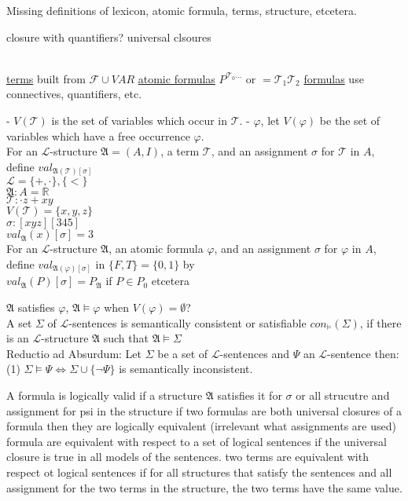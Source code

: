 \documentclass[11pt]{amsart}
\begin{document}
    Missing definitions of lexicon, atomic formula, terms, structure, etcetera.

    closure with quantifiers? universal clsoures
    \\ \\
    \newcommand{\FF}{\mathcal{F}}
    \newcommand{\LL}{\mathcal{L}}
    \newcommand{\TT}{\mathcal{T}}

    \underline{terms} built from $\FF \cup VAR$
    \underline{atomic formulas} $P^{\TT_0 ...}$ or $= \TT_1 \TT_2$
    \underline{formulas} use connectives, quantifiers, etc.


    - $V(\TT)$ is the set of variables which occur in $\TT$.
    - $\varphi$, let $V(\varphi)$ be the set of variables which have a free occurrence $\varphi$.
    \\
    For an $\LL$-structure $\mathfrak{A}=(A,I)$, a term $\TT$, and an assignment $\sigma$ for $\TT$ in $A$, define $val_{\mathfrak{A}(\TT)[\sigma]}$
    \\
    $\LL = \{+,\cdot\},\{<\}$ \\
    $\mathfrak{A}: A = \mathbb{R}$ \\
    $\TT: \cdot z + x y$ \\
    $V(\TT) = \{x,y,z\}$ \\
    $\sigma: [x y z][3 4 5]$ \\
    $val_\mathfrak{A}(x)[\sigma]=3$ \\

    For an $\LL$-structure $\mathfrak{A}$, an atomic formula $\varphi$, and an assignment $\sigma$ for $\varphi$ in $A$, define $val_{\mathfrak{A}(\varphi)[\sigma]}$ in $\{F,T\}=\{0,1\}$ by \\
    $val_\mathfrak{A}(P)[\sigma] = P_\mathfrak{A}$ if $P \in P_0$
    etcetera

    $\mathfrak{A}$ satisfies $\varphi$, $\mathfrak{A} \models \varphi$ when $V(\varphi) = \emptyset$?
    \\
    A set $\Sigma$ of $\LL$-sentences is semantically consistent or satisfiable $con_\models(\Sigma)$, if there is an $\LL$-structure $\mathfrak{A}$ such that $\mathfrak{A} \models \Sigma$
    \\
    Reductio ad Absurdum: Let $\Sigma$ be a set of $\LL$-sentences and $\Psi$ an $\LL$-sentence then:
    (1) $\Sigma \models \Psi \iff \Sigma \cup \{\neg \Psi\}$ is semantically inconsistent.

    A formula is logically valid if a structure $\mathfrak{A}$ satisfies it for $\sigma$ or all strucutre and assignment for psi in the structure
    if two formulas are both universal closures of a formula then they are logically equivalent (irrelevant what assignments are used)
    formula are equivalent with respect to a set of logical sentences if the universal closure is true in all models of the sentences.
    two terms are equivalent with respect ot logical sentences if for all structures that satisfy the sentences and all assignment for the two terms in the structure, the two terms have the same value.
\end{document}
